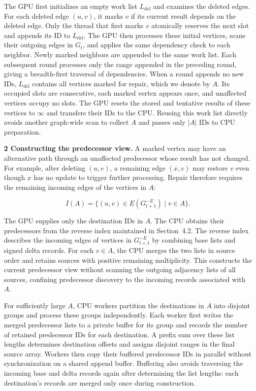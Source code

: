 The GPU first initializes an empty work list $L_{\mathrm{del}}$ and examines the deleted edges. For each deleted edge $(u,v)$, it marks $v$ if its current result depends on the deleted edge. Only the thread that first marks $v$ atomically reserves the next slot and appends its ID to $L_{\mathrm{del}}$. The GPU then processes these initial vertices, scans their outgoing edges in $G_t$, and applies the same dependency check to each neighbor. Newly marked neighbors are appended to the same work list. Each subsequent round processes only the range appended in the preceding round, giving a breadth-first traversal of dependencies. When a round appends no new IDs, $L_{\mathrm{del}}$ contains all vertices marked for repair, which we denote by $A$. Its occupied slots are consecutive, each marked vertex appears once, and unaffected vertices occupy no slots. The GPU resets the stored and tentative results of these vertices to $\infty$ and transfers their IDs to the CPU. Reusing this work list directly avoids another graph-wide scan to collect $A$ and passes only $|A|$ IDs to CPU preparation.

\textbf{2 Constructing the predecessor view.} A marked vertex may have an alternative path through an unaffected predecessor whose result has not changed. For example, after deleting $(u,v)$, a remaining edge $(x,v)$ may restore $v$ even though $x$ has no update to trigger further processing. Repair therefore requires the remaining incoming edges of the vertices in $A$:

\[
I(A)=\{(u,v)\in E(G_{t+1}^{-E})\mid v\in A\}.
\tag{5.1}
\]

The GPU supplies only the destination IDs in $A$. The CPU obtains their predecessors from the reverse index maintained in Section~4.2. The reverse index describes the incoming edges of vertices in $G_{t+1}^{-E}$ by combining base lists and signed delta records. For each $v\in A$, the CPU merges the two lists in source order and retains sources with positive remaining multiplicity. This constructs the current predecessor view without scanning the outgoing adjacency lists of all sources, confining predecessor discovery to the incoming records associated with $A$.

For sufficiently large $A$, CPU workers partition the destinations in $A$ into disjoint groups and process these groups independently. Each worker first writes the merged predecessor lists to a private buffer for its group and records the number of retained predecessor IDs for each destination. A prefix sum over these list lengths determines destination offsets and assigns disjoint ranges in the final source array. Workers then copy their buffered predecessor IDs in parallel without synchronization on a shared append buffer. Buffering also avoids traversing the incoming base and delta records again after determining the list lengths: each destination's records are merged only once during construction.

